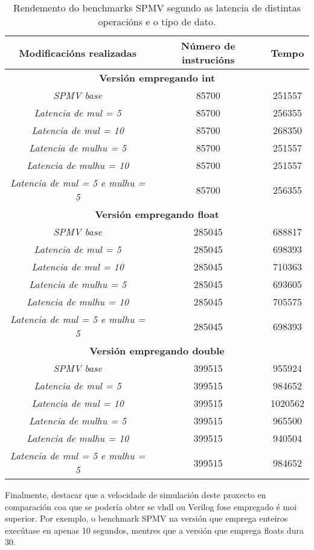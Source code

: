 \begin{table}[hp!]
    \centering
    \begin{tabular}{c|c|c}
    \rowcolor{udcpink!25}
    \textbf{Modificacións realizadas} & \textbf{Número de instrucións}  & \textbf{Tempo} 
    \\\hline
    \multicolumn{3}{c}{\textbf{Versión empregando int}} \\
    \textit{SPMV base} & 85700 & 251557 \\
    \textit{Latencia de mul = 5} & 85700 & 256355\\
    \textit{Latencia de mul = 10} & 85700 & 268350\\
     \textit{Latencia de mulhu = 5} & 85700 & 251557\\ %
    \textit{Latencia de mulhu = 10} & 85700 & 251557\\ 
    \textit{Latencia de mul = 5 e mulhu = 5} & 85700 & 256355\\
    
    \multicolumn{3}{c}{\textbf{Versión empregando float}} \\
    \textit{SPMV base} & 285045 & 688817 \\
    \textit{Latencia de mul = 5} & 285045 & 698393\\
    \textit{Latencia de mul = 10} & 285045 & 710363\\
     \textit{Latencia de mulhu = 5} & 285045 & 693605\\ 
    \textit{Latencia de mulhu = 10} & 285045 & 705575\\ 
    \textit{Latencia de mul = 5 e mulhu = 5} & 285045 & 698393\\

    \multicolumn{3}{c}{\textbf{Versión empregando double}} \\
    \textit{SPMV base} & 399515 & 955924 \\
    \textit{Latencia de mul = 5} & 399515 & 984652\\
    \textit{Latencia de mul = 10} & 399515 & 1020562\\
     \textit{Latencia de mulhu = 5} & 399515 & 965500\\ 
    \textit{Latencia de mulhu = 10} & 399515 & 940504\\ 
    \textit{Latencia de mul = 5 e mulhu = 5} & 399515 & 984652\\
    \end{tabular}
    \caption{Rendemento do benchmarks SPMV segundo as latencia de distintas operacións e o tipo de dato.}
    \label{tab:rendemento_spmv}
\end{table}

Finalmente, destacar que a velocidade de simulación deste proxecto en comparación coa que se podería obter se \acrshort{vhdl} ou Verilog fose empregado é moi superior. Por exemplo, o benchmark SPMV na versión que emprega enteiros execútase en apenas 10 segundos, mentres que a versión que emprega floats dura 30.

